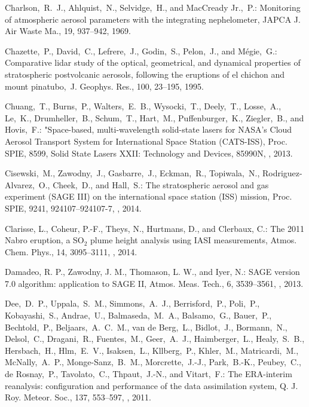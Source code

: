 \documentclass[amt]{copernicus}
\begin{document}
\begin{thebibliography}{99}
Charlson,~R.~J., Ahlquist,~N., Selvidge,~H., and MacCready Jr.,~P.:
Monitoring of atmospheric aerosol parameters with the integrating
nephelometer, JAPCA J. Air Waste Ma., 19, 937--942, 1969.


Chazette,~P., David,~C., Lefrere,~J., Godin,~S., Pelon,~J., and
M\'{e}gie,~G.: Comparative lidar study of the optical, geometrical, and
dynamical properties of stratospheric postvolcanic aerosols, following the
eruptions of el chichon and mount pinatubo,~J. Geophys. Res., 100, 23--195,
1995.

Chuang,~T., Burns,~P., Walters,~E.~B., Wysocki,~T., Deely,~T., Losse,~A., Le,~K.,
Drumheller,~B., Schum,~T., Hart,~M., Puffenburger,~K., Ziegler,~B., and Hovis,~F.:
"Space-based, multi-wavelength solid-state lasers for NASA's Cloud Aerosol Transport
System for International Space Station (CATS-ISS), Proc. SPIE, 8599, Solid State Lasers XXII:
Technology and Devices, 85990N, , 2013.

Cisewski,~M., Zawodny,~J., Gasbarre,~J., Eckman,~R., Topiwala,~N.,
Rodriguez-Alvarez,~O., Cheek,~D., and Hall,~S.: The stratospheric aerosol and
gas experiment (SAGE III) on the international space station (ISS) mission,
Proc. SPIE, 9241, 924107--924107-7,
, 2014.


Clarisse, L., Coheur, P.-F., Theys, N., Hurtmans, D., and Clerbaux, C.: The
2011 Nabro eruption, a SO$_2$ plume height analysis using IASI measurements,
Atmos. Chem. Phys., 14, 3095--3111, , 2014.



Damadeo, R. P., Zawodny, J. M., Thomason, L. W., and Iyer, N.: SAGE version
7.0 algorithm: application to SAGE II, Atmos. Meas. Tech., 6, 3539--3561,
, 2013.



Dee,~D.~P., Uppala,~S.~M., Simmons,~A.~J., Berrisford,~P., Poli,~P.,
Kobayashi,~S., Andrae,~U., Balmaseda,~M.~A., Balsamo,~G., Bauer,~P.,
Bechtold,~P., Beljaars,~A.~C.~M., van de Berg,~L., Bidlot,~J., Bormann,~N.,
Delsol,~C., Dragani,~R., Fuentes,~M., Geer,~A.~J., Haimberger,~L.,
Healy,~S.~B., Hersbach,~H., Hlm,~E.~V., Isaksen,~L., Kllberg,~P., Khler,~M.,
Matricardi,~M., McNally,~A.~P., Monge-Sanz,~B.~M., Morcrette,~J.-J.,
Park,~B.-K., Peubey,~C., de Rosnay,~P., Tavolato,~C., Thpaut,~J.-N., and
Vitart,~F.: The ERA-interim reanalysis: configuration and performance of the
data assimilation system, Q. J. Roy. Meteor. Soc., 137, 553--597,
, 2011.



\end{thebibliography}
\end{document}
